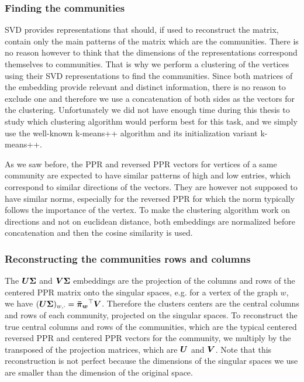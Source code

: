 \subsubsection{Finding the communities}
SVD provides representations that should, if used to reconstruct the matrix, contain only the main patterns of the matrix which are the communities. There is no reason however to think that the dimensions of the representations correspond themselves to communities. That is why we perform a clustering of the vertices using their SVD representations to find the communities. Since both matrices of the embedding provide relevant and distinct information, there is no reason to exclude one and therefore we use a concatenation of both sides as the vectors for the clustering. 
Unfortunately we did not have enough time during this thesis to study which clustering algorithm would perform best for this task, and we simply use the well-known k-means++ algorithm and its initialization variant k-means++.

As we saw before, the PPR and reversed PPR vectors for vertices of a same community are expected to have similar patterns of high and low entries, which correspond to similar directions of the vectors. They are however not supposed to have similar norms, especially for the reversed PPR for which the norm typically follows the importance of the vertex. To make the clustering algorithm work on directions and not on euclidean distance, both embeddings are normalized before concatenation and then the cosine similarity is used.

\subsubsection{Reconstructing the communities rows and columns}
The $\boldsymbol{U}\boldsymbol{\Sigma}$ and $\boldsymbol{V}\boldsymbol{\Sigma}$ embeddings are the projection of the columns and rows of the centered PPR matrix onto the singular spaces, e.g. for a vertex of the graph $w$, we have $ (\boldsymbol{U}\boldsymbol{\Sigma})_{w, \cdot} = \boldsymbol{\Bar{\pi}_w}^\top\boldsymbol{V}$. Therefore the clusters centers are the central columns and rows of each community, projected on the singular spaces. To reconstruct the true central columns and rows of the communities, which are the typical centered reversed PPR and centered PPR vectors for the community, we multiply by the transposed of the projection matrices, which are $\boldsymbol{U}$ and $\boldsymbol{V}$. Note that this reconstruction is not perfect because the dimensions of the singular spaces we use are smaller than the dimension of the original space.

